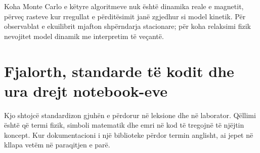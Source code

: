 \documentclass[11pt,oneside,openany]{book}
\begin{document}
Koha Monte Carlo e këtyre algoritmeve nuk është dinamika reale e magnetit, përveç rasteve kur rregullat e përditësimit janë zgjedhur si model kinetik. Për observablat e ekuilibrit mjafton shpërndarja stacionare; për koha relaksimi fizik nevojitet model dinamik me interpretim të veçantë.




\appendix

\chapter{Fjalorth, standarde të kodit dhe ura drejt notebook-eve}
Kjo shtojcë standardizon gjuhën e përdorur në leksione dhe në laborator. Qëllimi është që termi fizik, simboli matematik dhe emri në kod të tregojnë të njëjtin koncept. Kur dokumentacioni i një biblioteke përdor termin anglisht, ai jepet në kllapa vetëm në paraqitjen e parë.
\end{document}
